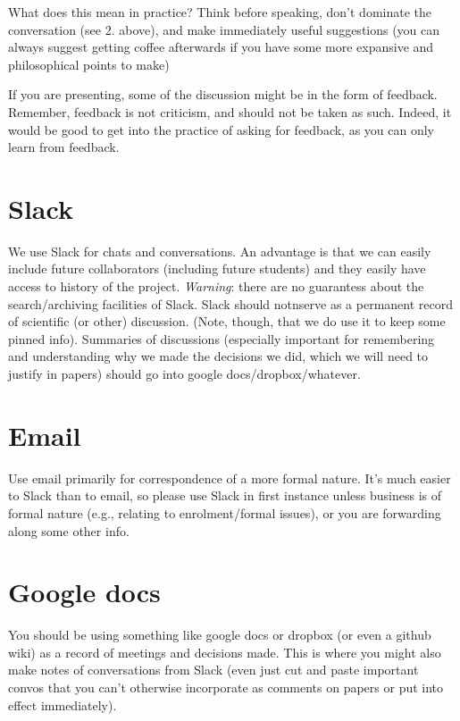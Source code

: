\documentclass[]{book}
\theoremstyle{definition}
\theoremstyle{definition}
\theoremstyle{definition}
\theoremstyle{remark}
\begin{document}
What does this mean in practice? Think before speaking, don't dominate
the conversation (see 2. above), and make immediately useful suggestions
(you can always suggest getting coffee afterwards if you have some more
expansive and philosophical points to make)

If you are presenting, some of the discussion might be in the form of
feedback. Remember, feedback is not criticism, and should not be taken
as such. Indeed, it would be good to get into the practice of asking for
feedback, as you can only learn from feedback.

\hypertarget{slack}{%
\section{Slack}\label{slack}}

We use Slack for chats and conversations. An advantage is that we can
easily include future collaborators (including future students) and they
easily have access to history of the project. \emph{Warning}: there are
no guarantess about the search/archiving facilities of Slack. Slack
should notnserve as a permanent record of scientific (or other)
discussion. (Note, though, that we do use it to keep some pinned info).
Summaries of discussions (especially important for remembering and
understanding why we made the decisions we did, which we will need to
justify in papers) should go into google docs/dropbox/whatever.

\hypertarget{email}{%
\section{Email}\label{email}}

Use email primarily for correspondence of a more formal nature. It's
much easier to Slack than to email, so please use Slack in first
instance unless business is of formal nature (e.g., relating to
enrolment/formal issues), or you are forwarding along some other info.

\hypertarget{google-docs}{%
\section{Google docs}\label{google-docs}}

You should be using something like google docs or dropbox (or even a
github wiki) as a record of meetings and decisions made. This is where
you might also make notes of conversations from Slack (even just cut and
paste important convos that you can't otherwise incorporate as comments
on papers or put into effect immediately).
\end{document}
